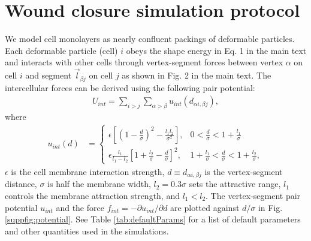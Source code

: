 \documentclass[%
 reprint,
superscriptaddress,
 amsmath,amssymb,
pre,
]{revtex4-2}
\begin{document}
\section{Wound closure simulation protocol}

We model cell monolayers as nearly confluent packings of deformable particles. Each deformable particle (cell) $i$ obeys the shape energy in Eq. 1 in the main text and interacts with other cells through vertex-segment forces between vertex $\alpha$ on cell $i$ and segment ${\vec l}_{\beta j}$ on cell $j$ as shown in Fig. 2 in the main text. The intercellular forces can be derived using the following pair potential: 
\begin{align}\label{suppeq:pair_potential}
    U_{int} = \sum_{i>j} \sum_{\alpha > \beta} u_{int}(d_{\alpha i, \beta j}),
\end{align}
where 
\begin{align}
    u_{int}(d) &=  
    \begin{cases}
        \epsilon\left[(1-\frac{d}{\sigma})^2 - \frac{l_1l_2}{\sigma^2}\right], &0 < \frac{d}{\sigma} < 1 + \frac{l_1}{\sigma}\\
        \epsilon \frac{l_1}{l_1-l_2} \left[1+\frac{l_2}{\sigma}-\frac{d}{\sigma}\right]^2, &1 + \frac{l_1}{\sigma} < \frac{d}{\sigma} < 1 + \frac{l_2}{\sigma},
    \end{cases}
\end{align}
$\epsilon$ is the cell membrane interaction strength, $d\equiv d_{\alpha i, \beta j}$ is the vertex-segment distance, $\sigma$ is half the membrane width, $l_2 = 0.3\sigma$ sets the attractive range, $l_1$ controls the membrane attraction strength, and $l_1 < l_2$. The vertex-segment pair potential $u_{int}$ and the force $f_{int} = -\partial{u_{int}}/\partial{d}$ are plotted against $d/\sigma$ in Fig. \ref{suppfig:potential}. See Table \ref{tab:defaultParams} for a list of default parameters and other quantities used in the simulations.
\end{document}
